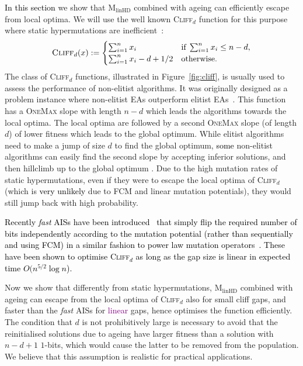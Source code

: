\documentclass[lettersize,journal]{IEEEtran}
\newcommand{\new}[1]{\textcolor{black}{#1}}
\newcommand{\rerev}[1]{\textcolor{purple}{#1}}
\newcommand{\rev}[1]{\textcolor{black}{#1}}
\newcommand{\cliff}{\textsc{Cliff}$_d$}
\newcommand{\linHD}{M$_{\text{linHD}}$}
\begin{document}
\new{ In this section} we show that {\linHD } combined with ageing can efficiently escape from local optima. We will use the well known \cliff{} function for this purpose where static hypermutations are inefficient~\cite{CorusOlivetoYazdani2019TCS}:
\begin{equation} \label{func:cliff}
	\textsc{Cliff}_{d}(x):=\begin{cases}
		\sum_{i=1}^n x_i & \text{if}\; \sum_{i=1}^n x_i \leq n-d, \\
		\sum_{i=1}^n x_i -d+ 1/2 & \text{otherwise.}
	\end{cases}
\end{equation}
The class of \cliff{} functions, illustrated in Figure~\ref{fig:cliff}, is usually used to assess the performance of non-elitist algorithms. It was originally designed as a problem instance where non-elitist EAs outperform elitist EAs~\cite{JaegerskuepperStorch}. This function  has a \textsc{OneMax} slope with length $n-d$ which leads the algorithms towards the local optima. The local optima are followed by a second \textsc{OneMax} slope (of length $d$) of lower fitness which leads to the global optimum. While elitist algorithms need to make a jump of size $d$ to find the global optimum, \rev{some} non-elitist algorithms can easily find the second slope by accepting inferior solutions, and then hillclimb up to the global optimum \cite{LissovoiOlivetoWarwicker2019AAAI,CorusOlivetoYazdani2019TCS,CorusOlivetoYazdani2021TEVC,HeviaSudholtAlgo24,DoerrIJCAI-25}. 
Due to the high mutation rates of static hypermutations, even if they were to escape the local optima of \cliff{} (which is \new{very unlikely} due to FCM and linear mutation potentials), they would still jump back with high probability.  

\textcolor{black}{Recently {\it fast} AISs have been introduced~\cite{CorusOlivetoYazdani2021TEVC} that simply flip the required number of bits independently according to the mutation potential (rather than sequentially and using FCM) in a similar fashion to power law mutation operators~\cite{DoerrGECCO2017FastGA}. These have been shown to optimise \cliff{} as long as the gap size is linear in expected time $O(n^{5/2} \log n$).
}

Now we show that differently from static hypermutations, {\linHD }
combined with ageing can escape from the local optima of \cliff{} also for small cliff gaps, and faster than the {\it fast} AISs for \rerev{linear} gaps, 
hence optimises the function efficiently. The condition that $d$ is not prohibitively large is necessary to avoid
that the reinitialised solutions due to ageing have larger fitness than a solution with $n-d+1$ $1$-bits, {\color{black} which would cause the latter to be removed from the population}.
We believe that this assumption is realistic for practical applications. 
\end{document}
